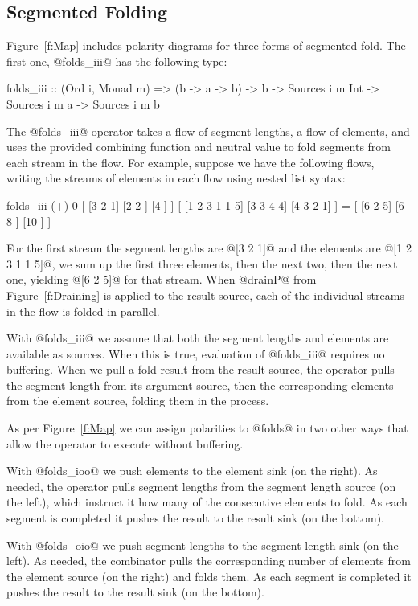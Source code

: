 \subsection{Segmented Folding}
Figure~\ref{f:Map} includes polarity diagrams for three forms of segmented fold. The first one, @folds_iii@ has the following type:
\begin{code}
folds_iii :: (Ord i, Monad m) => (b -> a -> b) -> b
          -> Sources i m Int  -> Sources i m a 
          -> Sources i m b
\end{code}

The @folds_iii@ operator takes a flow of segment lengths, a flow of elements, and uses the provided combining function and neutral value to fold segments from each stream in the flow. For example, suppose we have the following flows, writing the streams of elements in each flow using nested list syntax:
\begin{code}
folds_iii (+) 0 
   [ [3     2   1] [2   2  ] [4      ] ] 
   [ [1 2 3 1 1 5] [3 3 4 4] [4 3 2 1] ]
 = [ [6     2   5] [6   8  ] [10     ] ]
\end{code}

For the first stream the segment lengths are @[3 2 1]@ and the elements are @[1 2 3 1 1 5]@, we sum up the first three elements, then the next two, then the next one, yielding @[6 2 5]@ for that stream. When @drainP@ from Figure~\ref{f:Draining} is applied to the result source, each of the individual streams in the flow is folded in parallel. 

With @folds_iii@ we assume that both the segment lengths and elements are available as sources. When this is true, evaluation of @folds_iii@ requires no buffering. When we pull a fold result from the result source, the operator pulls the segment length from its argument source, then the corresponding elements from the element source, folding them in the process. 

As per Figure~\ref{f:Map} we can assign polarities to @folds@ in two other ways that allow the operator to execute without buffering. 

With @folds_ioo@ we push elements to the element sink (on the right). As needed, the operator pulls segment lengths from the segment length source (on the left), which instruct it how many of the consecutive elements to fold. As each segment is completed it pushes the result to the result sink (on the bottom).

With @folds_oio@ we push segment lengths to the segment length sink (on the left). As needed, the combinator pulls the corresponding number of elements from the element source (on the right) and folds them. As each segment is completed it pushes the result to the result sink (on the bottom). 

